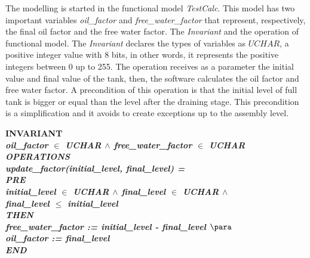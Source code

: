 The modelling is started in the functional model \textit{TestCalc}. This model
has two important variables \textit{oil\_factor} and \textit{free\_water\_factor}
that represent, respectively, the final oil factor and the free water factor. The
\textit{Invariant} and the operation of functional model. The \textit{Invariant}
declares the types of variables as $\textit{UCHAR}$, a positive integer value
with 8 bits, in other words, it represents the positive integers between 0 up to
255. The operation receives as a parameter the initial value and final value of
the tank, then, the software calculates the oil factor and free water factor. A
precondition of this operation is that the initial level of full tank is bigger
or equal than the level after the draining stage. This precondition is a
simplification and it avoids to create exceptions up to the assembly level.


\small{
\begin{sloppypar}
\hspace*{-0.30in}\bf INVARIANT\\
\hspace*{0.40in}\it oil\_factor  $\in$  \it UCHAR  $\land$  \it free\_water\_factor  $\in$  \it UCHAR\\
\bf OPERATIONS\\
\hspace*{0.20in}\bf update\_factor\rm (\it initial\_level\rm , \it final\_level\rm ) \rm =\\
\hspace*{0.20in}\bf PRE\\ 
\hspace*{0.40in}\it initial\_level  $\in$  \it UCHAR  $\land$  \it final\_level\hspace*{0.10in} $\in$ 
\it UCHAR  $\land$\\
\hspace*{0.40in}\it final\_level  $\leq$  \it initial\_level\\ 
\hspace*{0.20in}\bf THEN\\
\hspace*{0.40in}\it free\_water\_factor \rm := \it initial\_level \rm - \it final\_level $\para$\\ 
\hspace*{0.40in}\it oil\_factor \rm := \it final\_level\\
\hspace*{0.20in}\bf END
\end{sloppypar}
}

